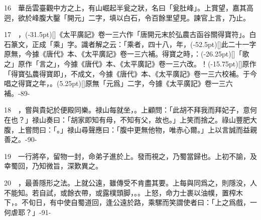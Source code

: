 \documentclass[UTF8,scheme=chinese]{ctexbook}
\newcommand{\pagenum}{\footnotesize\heiti\color{red}}
\begin{document}
\vspace{1.5em}

16　華岳雲臺觀中方之上，有山崛起半瓮之狀，名曰「瓮肚峰」。上賞望，嘉其高迥，欲於峰腹大鑿「開元」二字，填以白石，令百餘里望見。諫官上言，乃止。

\vspace{1.5em}

17　，\sidenote(-31.5pt)[]{《太平廣記》卷一三六作「唐開元末於弘農古函谷關得寶符」。}白石篆文，正成「乘」字。識者解之云：「乘者，四十八，年，\sidenote(-52.5pt)[]{此二十一字原無，今據《唐代》本、《太平廣記》卷一三六補。}得寶之時，：\sidenote(-26.25pt)[]{「歌之」原作「言之」，今據《唐代》本、《太平廣記》卷一三六改。}！\sidenote(-15.75pt)[]{原作「得寶弘農得寶即」，不成文，今據《唐代》本、《太平廣記》卷一三六校補。}于今唱之得寶之年，。\sidenote(5.25pt)[]{原無「元爲」二字，今據《太平廣記》卷一三六補。}{\pagenum -89-}

\vspace{1.5em}

18　，嘗與貴妃於便殿同樂。禄山每就坐，。上顧問：「此胡不拜我而拜妃子，意何在也？」禄山奏曰：「胡家即知有母，不知有父，故也。」上笑而捨之。祿山豐肥大腹，上嘗問曰：「。」禄山尋聲應曰：「腹中更無他物，唯赤心爾。」上以言誠而益親善之。{\pagenum -90-}

\vspace{1.5em}

19　一行將卒，留物一封，命弟子進於上。發而視之，乃蜀當歸也。上初不諭，及幸蜀回，乃知微旨，深歎異之。

\vspace{1.5em}

20　，最善隱形之法。上就公遠，雖傳受不肯盡其要。上每與同爲之，則隱没，人不能知。若自試，或餘衣帶，或露樸頭脚，。。上怒，命力士裹以油幞，置榨木下，。不旬日，有中使自蜀道回，逢公遠於路，乘騾而笑謂使者曰：「上之爲戲，一何虐耶？」{\pagenum -91-}
\end{document}
